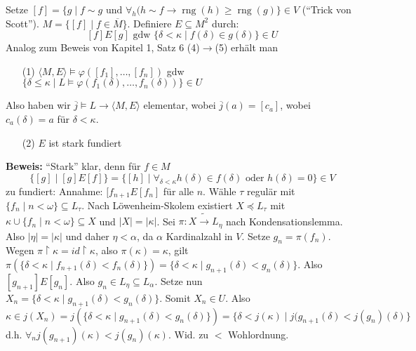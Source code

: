 \documentclass[a4paper,fontsize=11pt]{scrartcl}
\newcommand{\rng}{\operatorname{rng}}
\renewcommand{\bar}[1]{\overline{#1}}
\begin{document}
		Setze $[f] = \{g\mid f\sim g \mbox{ und } \forall_{h} (h\sim f\to \rng(h)\ge \rng(g)\}\in V$ ("`Trick von Scott"').
		$M=\{[f]\mid f\in \bar M\}$.
		Definiere $E\subseteq M^2$ durch: 
		\[ [f]E[g] \mbox{ gdw } \{\delta<\kappa\mid f(\delta)\in g(\delta)\}\in U \]
		Analog zum Beweis von Kapitel 1, Satz 6 (4)$\to$(5) erhält man
		\begin{itemize}
			\item[(1)] $\langle M,E\rangle\models \varphi([f_1],\ldots,[f_n])$ gdw $\{\delta\le\kappa\mid L\models \varphi(f_1(\delta),\ldots,f_n(\delta))\}\in U$
		\end{itemize}
		Also haben wir $\bar j\models L\to \langle M,E\rangle$ elementar, wobei $\bar j(a)=[c_a]$, wobei $c_a(\delta)=a$ für $\delta<\kappa$.
		\begin{itemize}
			\item[(2)] $E$ ist stark fundiert
		\end{itemize}
		{\bf Beweis:} "`Stark"' klar, denn für $f\in M$
		\[\{[g]\mid [g]E[f]\} = \{[h]\mid \forall_{\delta<\kappa} h(\delta)\in f(\delta)\mbox{ oder } h(\delta)=0 \}\in V \]
		zu fundiert: Annahme: $[f_{n+1}E[f_n]$ für alle $n$.
		Wähle $\tau$ regulär mit $\{ f_n\mid n<\omega\}\subseteq L_{\tau}$.
		Nach Löwenheim-Skolem existiert $X\preceq L_{\tau}$ mit $\kappa\cup\{f_n\mid n<\omega\}\subseteq X$ und $|X|=|\kappa|$.
		Sei $\pi\colon X\tilde\to L_{\eta}$ nach Kondensationslemma.
		Also $|\eta|=|\kappa|$ und daher $\eta<\alpha$, da $\alpha$ Kardinalzahl in $V$.
		Setze $g_n=\pi(f_n)$.
		Wegen $\pi\upharpoonright\kappa=id\upharpoonright\kappa$, also $\pi(\kappa)=\kappa$, gilt $\pi(\{\delta<\kappa\mid f_{n+1}(\delta)<f_n(\delta)\})=\{\delta<\kappa\mid g_{n+1}(\delta)<g_n(\delta)\}$.
		Also $[g_{n+1}]E[g_n]$.
		Also $g_n\in L_{\eta}\subseteq L_{\alpha}$.
		Setze nun $X_n=\{\delta<\kappa\mid g_{n+1}(\delta)<g_n(\delta)\}$.
		Somit $X_n\in U$.
		Also \[\kappa\in j(X_n)=j(\{\delta<\kappa\mid g_{n+1}(\delta)<g_n(\delta)\}) = \{ \delta<j(\kappa)\mid j(g_{n+1}(\delta)<j(g_n)(\delta)\}\]
		d.h. $\forall_n j(g_{n+1})(\kappa)<j(g_n)(\kappa)$.
		Wid. zu $<$ Wohlordnung.
		
\end{document}
